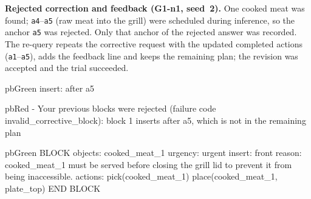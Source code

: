 \noindent\textbf{Rejected correction and feedback (G1-n1, seed~2).} One cooked meat was found; \texttt{a4}--\texttt{a5}
(raw meat into the grill) were scheduled during inference, so the anchor \texttt{a5} was rejected. Only that anchor
of the rejected answer was recorded. The re-query repeats the corrective request with the updated completed
actions (\texttt{a1}--\texttt{a5}), adds the feedback line and keeps the remaining plan; the revision was accepted
and the trial succeeded.

\noindent\begin{minipage}[t]{0.49\textwidth}\vspace{0pt}
\begin{promptbox}[unbreakable]{pbGreen}{}
insert: after a5
\end{promptbox}
\begin{promptbox}[unbreakable]{pbRed}{}
- Your previous blocks were rejected (failure code invalid_corrective_block): block 1 inserts after a5, which is not in the remaining plan
\end{promptbox}
\end{minipage}\hfill
\begin{minipage}[t]{0.49\textwidth}\vspace{0pt}
\begin{promptbox}[unbreakable]{pbGreen}{}
BLOCK
objects: cooked_meat_1
urgency: urgent
insert: front
reason: cooked_meat_1 must be served before closing the grill lid to prevent it from being inaccessible.
actions:
pick(cooked_meat_1)
place(cooked_meat_1, plate_top)
END BLOCK
\end{promptbox}
\end{minipage}
